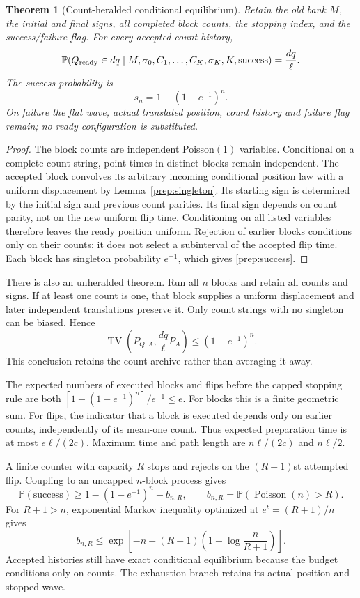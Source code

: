 \documentclass[11pt,oneside,openany]{book}
\newtheorem{theorem}{Theorem}[chapter]
\theoremstyle{definition}
\theoremstyle{remark}\newtheorem{remark}[theorem]{Remark}
\begin{document}
\begin{theorem}[Count-heralded conditional equilibrium]
\label{prep:herald}
Retain the old bank $M$, the initial and final signs, all completed
block counts, the stopping index, and the success/failure flag.
For every accepted count history,
\[
 \mathbb P(Q_{\rm ready}\in dq\mid
         M,\sigma_0,C_1,\ldots,C_K,\sigma_K,K,\mathrm{success})
       =\frac{dq}{\ell}.
\]
The success probability is
\begin{equation}
 s_n=1-(1-e^{-1})^n.
 \label{prep:success}
\end{equation}
On failure the flat wave, actual translated position, count history and
failure flag remain; no ready configuration is substituted.
\end{theorem}
\begin{proof}
The block counts are independent Poisson$(1)$ variables. Conditional on
a complete count string, point times in distinct blocks remain independent.
The accepted block convolves its arbitrary incoming conditional position
law with a uniform displacement by Lemma~\ref{prep:singleton}.
Its starting sign is determined by the initial sign and previous count
parities. Its final sign depends on count parity, not on the new uniform
flip time. Conditioning on all listed variables therefore leaves the
ready position uniform. Rejection of earlier blocks conditions only on
their counts; it does not select a subinterval of the accepted flip time.
Each block has singleton probability $e^{-1}$, which gives
\eqref{prep:success}.
\end{proof}

There is also an unheralded theorem. Run all $n$ blocks and retain all
counts and signs. If at least one count is one, that block supplies a
uniform displacement and later independent translations preserve it.
Only count strings with no singleton can be biased. Hence
\[
 \operatorname{TV}\left(P_{Q,A},\frac{dq}{\ell}P_A\right)
       \le(1-e^{-1})^n.
\]
This conclusion retains the count archive rather than averaging it away.

The expected numbers of executed blocks and flips before the capped stopping
rule are both $[1-(1-e^{-1})^n]/e^{-1}\le e$.
For blocks this is a finite geometric sum. For flips, the indicator that a
block is executed depends only on earlier counts, independently of its
mean-one count. Thus expected preparation time is at most $e\ell/(2c)$.
Maximum time and path length are $n\ell/(2c)$ and $n\ell/2$.

A finite counter with capacity $R$ stops and rejects on the $(R+1)$st
attempted flip. Coupling to an uncapped $n$-block process gives
\[
 \mathbb P(\mathrm{success})\ge
       1-(1-e^{-1})^n-b_{n,R},\qquad
 b_{n,R}=\mathbb P(\operatorname{Poisson}(n)>R).
\]
For $R+1>n$, exponential Markov inequality optimized at
$e^t=(R+1)/n$ gives
\[
 b_{n,R}\le
 \exp\!\left[-n+(R+1)\!\left(1+\log\frac n{R+1}\right)\right].
\]
Accepted histories still have exact conditional equilibrium because the
budget conditions only on counts. The exhaustion branch retains its actual
position and stopped wave.
\end{document}
